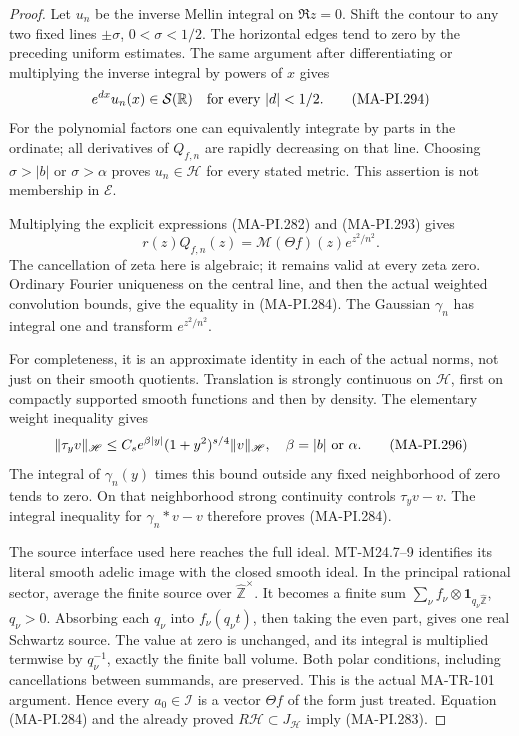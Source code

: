 \begin{proof}
Let \(u_n\) be the inverse Mellin integral on
\(\Re z=0\).  Shift the contour to any two fixed
lines \(\pm\sigma\), \(0<\sigma<1/2\).
The horizontal edges tend to zero by the preceding
uniform estimates.  The same argument after
differentiating or multiplying the inverse integral
by powers of \(x\) gives
\[
                  e^{d x}u_n(x)\in\mathcal S(\mathbb R)
                  \quad\hbox{for every }|d|<1/2.
 \tag{MA-PI.294}
\]
For the polynomial factors one can equivalently
integrate by parts in the ordinate; all derivatives
of \(Q_{f,n}\) are rapidly decreasing on that line.
Choosing \(\sigma>|b|\) or \(\sigma>\alpha\)
proves \(u_n\in\mathscr H\) for every stated metric.
This assertion is not membership in \(\mathcal E\).

Multiplying the explicit expressions (MA-PI.282)
and (MA-PI.293) gives
\[
           r(z)Q_{f,n}(z)
             =\mathcal M(\Theta f)(z)e^{z^2/n^2}.
 \tag{MA-PI.295}
\]
The cancellation of zeta here is algebraic; it
remains valid at every zeta zero.  Ordinary Fourier
uniqueness on the central line, and then the actual
weighted convolution bounds, give the equality in
(MA-PI.284).  The Gaussian \(\gamma_n\) has integral
one and transform \(e^{z^2/n^2}\).

For completeness, it is an approximate identity in
each of the actual norms, not just on their smooth
quotients.  Translation is strongly continuous on
\(\mathscr H\), first on compactly supported smooth
functions and then by density.  The elementary
weight inequality gives
\[
 \|\tau_y v\|_{\mathscr H}
       \le C_s e^{\beta|y|}(1+y^2)^{s/4}
                    \|v\|_{\mathscr H},
 \quad
 \beta=|b|\ \hbox{or}\ \alpha.
 \tag{MA-PI.296}
\]
The integral of \(\gamma_n(y)\) times this bound
outside any fixed neighborhood of zero tends to
zero.  On that neighborhood strong continuity
controls \(\tau_yv-v\).  The integral inequality
for \(\gamma_n*v-v\) therefore proves (MA-PI.284).

The source interface used here reaches the full
ideal.  MT-M24.7--9 identifies its literal smooth
adelic image with the closed smooth ideal.
In the principal rational sector, average the
finite source over \(\widehat{\mathbb Z}^{\times}\).
It becomes a finite sum
\(\sum_\nu f_\nu\otimes\mathbf1_{q_\nu\widehat{\mathbb Z}}\),
\(q_\nu>0\).  Absorbing each \(q_\nu\) into
\(f_\nu(q_\nu t)\), then taking the even part,
gives one real Schwartz source.  The value at zero
is unchanged, and its integral is multiplied
termwise by \(q_\nu^{-1}\), exactly the finite
ball volume.  Both polar conditions, including
cancellations between summands, are preserved.
This is the actual MA-TR-101 argument.  Hence
every \(a_0\in\mathscr I\) is a vector \(\Theta f\)
of the form just treated.  Equation (MA-PI.284)
and the already proved \(R\mathscr H\subset
J_{\mathscr H}\) imply (MA-PI.283).


\end{proof}
